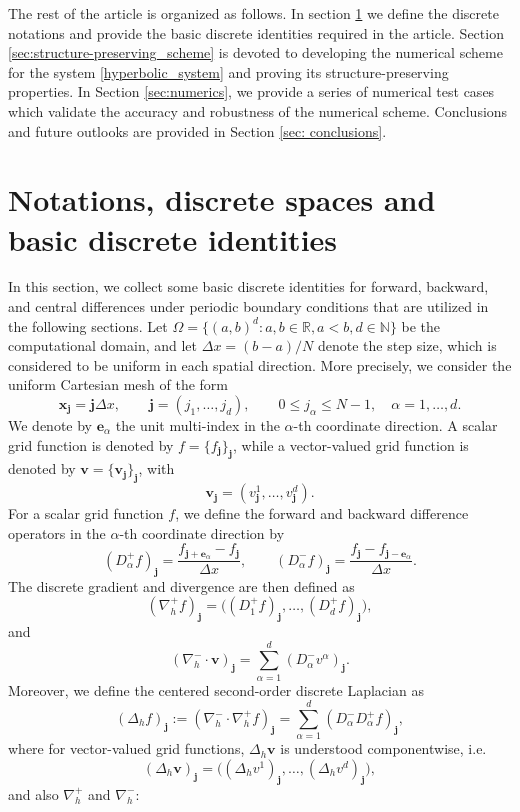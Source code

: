 \documentclass[11pt]{article}
\numberwithin{equation}{section}
\newtheorem{counter example}[theorem]{Counter Example}
\numberwithin{equation}{section}
\numberwithin{equation}{section}
\begin{document}
The rest of the article is organized as follows. In section \ref{sec:discrete_spaces} we define the discrete notations and provide the basic discrete identities required in the article. Section \ref{sec:structure-preserving_scheme} is devoted to developing the numerical scheme for the system \eqref{hyperbolic_system} and proving its structure-preserving properties. In Section \ref{sec:numerics}, we provide a series of numerical test cases which validate the accuracy and robustness of the numerical scheme. Conclusions and future outlooks are provided in Section \ref{sec: conclusions}.%

\section{Notations, discrete spaces and basic discrete identities}\label{sec:discrete_spaces}
In this section, we collect some basic discrete identities for forward, backward, and central differences under periodic boundary conditions that are utilized in the following sections. Let $\Omega=\{(a,b)^d: a, b\in\mathbb{R}, a<b, d\in \mathbb{N}\}$ be the computational domain, and let $\Delta x=(b-a)/N$ denote the step size, which is considered to be uniform in each spatial direction. More precisely, we consider the uniform Cartesian mesh of the form
\[
\mathbf{x}_\mathbf{j}=\mathbf{j}\Delta x,\qquad \mathbf{j}=(j_1,\ldots,j_d),
\qquad 0\leq j_\alpha\leq N-1,\quad \alpha=1,\ldots,d.
\]
We denote by $\mathbf{e}_\alpha$ the unit multi-index in the $\alpha$-th coordinate direction. A scalar grid function is denoted by
$f=\{f_{\mathbf j}\}_{\mathbf j}$, while a vector-valued grid function is denoted by
$\mathbf v=\{\mathbf v_{\mathbf j}\}_{\mathbf j}$, with
\[
\mathbf v_{\mathbf j}=(v_{\mathbf{j}}^1,\ldots,v_{\mathbf{j}}^d).
\]
For a scalar grid function $f$, we define the forward and backward difference operators in the $\alpha$-th coordinate direction by
\[
(D_\alpha^+ f)_{\mathbf j}=\frac{f_{\mathbf j+\mathbf e_\alpha}-f_{\mathbf j}}{\Delta x},
\qquad
(D_\alpha^- f)_{\mathbf j}=\frac{f_{\mathbf j}-f_{\mathbf j-\mathbf e_\alpha}}{\Delta x}.
\]
The discrete gradient and divergence are then defined as
\[
(\nabla_h^+ f)_{\mathbf j}=\bigl((D_1^+f)_{\mathbf j},\ldots,(D_d^+f)_{\mathbf j}\bigr),
\]
and
\[
(\nabla_h^-\cdot\mathbf v)_{\mathbf j}=\sum_{\alpha=1}^d (D_\alpha^-v^\alpha)_{\mathbf j}.
\]
Moreover, we define the centered second-order discrete Laplacian as
\[
(\Delta_h f)_{\mathbf{j}}:=(\nabla_h^-\cdot\nabla_h^+f)_{\mathbf{j}}
=
\sum_{\alpha=1}^d (D_\alpha^-D_\alpha^+f)_{\mathbf{j}},
\]
where for vector-valued grid functions, $\Delta_h\mathbf v$ is understood componentwise, i.e.
\[
(\Delta_h\mathbf v)_{\mathbf j}=\bigl((\Delta_h v^1)_{\mathbf j},\ldots,(\Delta_h v^d)_{\mathbf j}\bigr),
\]
and also $\nabla_h^+$ and $\nabla_h^-$:
\end{document}
